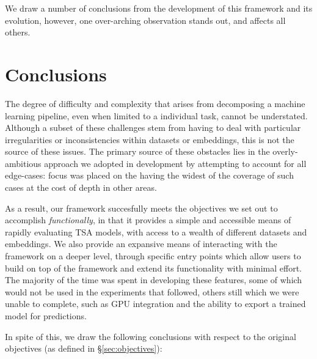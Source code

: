 \documentclass[../../fyp.tex]{subfiles}
\begin{document}
We draw a number of conclusions from the development of this framework and its evolution, however, one over-arching observation stands out, and affects all others. 

\section{Conclusions}
The degree of difficulty and complexity that arises from decomposing a machine learning pipeline, even when limited to a individual task, cannot be understated. Although a subset of these challenges stem from having to deal with particular irregularities or inconsistencies within datasets or embeddings, this is not the source of these issues. The primary source of these obstacles lies in the overly-ambitious approach we adopted in development by attempting to account for all edge-cases: focus was placed on the having the widest of the coverage of such cases at the cost of depth in other areas. 

As a result, our framework succesfully meets the objectives we set out to accomplish \textit{functionally}, in that it provides a simple and accessible means of rapidly evaluating TSA models, with access to a wealth of different datasets and embeddings. We also provide an expansive means of interacting with the framework on a deeper level, through specific entry points which allow users to build on top of the framework and extend its functionality with minimal effort. The majority of the time was spent in developing these features, some of which would not be used in the experiments that followed, others still which we were unable to complete, such as GPU integration and the ability to export a trained model for predictions.

In spite of this, we draw the following conclusions with respect to the original objectives (as defined in \S\ref{sec:objectives}):
\end{document}
